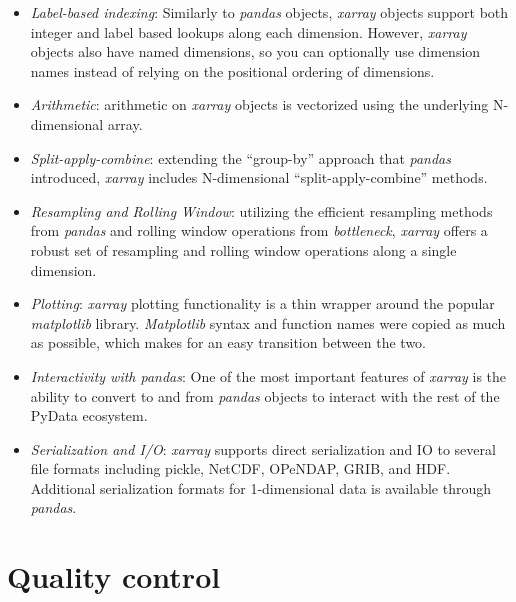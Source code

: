 \documentclass{jors}
\begin{document}
\begin{itemize}
	\item \textit{Label-based indexing}: Similarly to \textit{pandas} objects, \textit{xarray} objects support both integer and label based lookups along each dimension.
	However, \textit{xarray} objects also have named dimensions, so you can optionally use dimension names instead of relying on the positional ordering of dimensions.
	\item \textit{Arithmetic}: arithmetic on \textit{xarray} objects is vectorized using the underlying N-dimensional array.
	\item \textit{Split-apply-combine}: extending the ``group-by'' approach that \textit{pandas} introduced, \textit{xarray} includes N-dimensional ``split-apply-combine'' methods.
	\item \textit{Resampling and Rolling Window}: utilizing the efficient resampling methods from \textit{pandas} and rolling window operations from \textit{bottleneck}, \textit{xarray} offers a robust set of resampling and rolling window operations along a single dimension.
	\item \textit{Plotting}: \textit{xarray} plotting functionality is a thin wrapper around the popular \textit{matplotlib} library. \textit{Matplotlib} syntax and function names were copied as much as possible, which makes for an easy transition between the two.
	\item \textit{Interactivity with pandas}: One of the most important features of \textit{xarray} is the ability to convert to and from \textit{pandas} objects to interact with the rest of the PyData ecosystem.
	\item \textit{Serialization and I/O}: \textit{xarray} supports direct serialization and IO to several file formats including pickle, NetCDF, OPeNDAP, GRIB, and HDF. Additional serialization formats for 1-dimensional data is available through \textit{pandas}.
\end{itemize}

\section*{Quality control}

\end{document}
